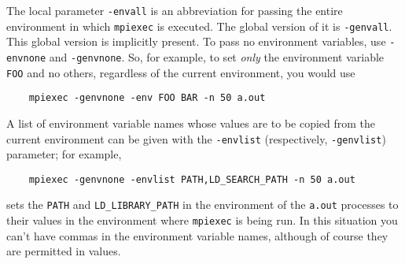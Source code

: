 \documentclass[dvipdfm,11pt]{article}
\begin{document}
The local parameter \texttt{-envall} is an abbreviation for passing the
entire environment in which \texttt{mpiexec} is executed.  The global
version of it is \texttt{-genvall}.  This global version is implicitly
present.  To pass no environment variables, use \texttt{-envnone} and
\texttt{-genvnone}.  So, for example, to set \emph{only} the environment
variable \texttt{FOO} and no others, regardless of the current
environment, you would use 
\begin{verbatim}
    mpiexec -genvnone -env FOO BAR -n 50 a.out
\end{verbatim}

A list of environment variable names whose values are
to be copied from the current environment can be given with the
\texttt{-envlist} (respectively, \texttt{-genvlist}) parameter; for example,
\begin{verbatim}
    mpiexec -genvnone -envlist PATH,LD_SEARCH_PATH -n 50 a.out
\end{verbatim}
sets the \texttt{PATH} and \texttt{LD\_LIBRARY\_PATH} in the environment
of the \texttt{a.out} processes to their values in the environment where
\texttt{mpiexec} is being run.  In this situation you can't have commas
in the environment variable names, although of course they are permitted
in values.
\end{document}
